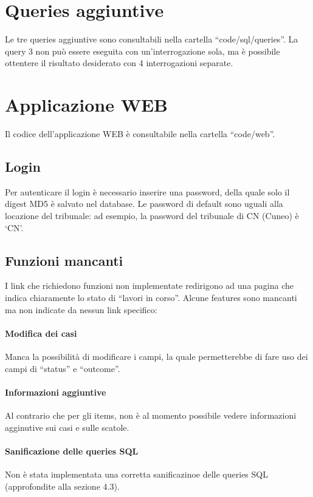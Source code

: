 {\section{Queries aggiuntive}

Le tre queries aggiuntive sono consultabili nella cartella ``code/sql/queries''. La query 3 non può essere eseguita con un'interrogazione sola, ma è possibile ottentere il risultato desiderato con 4 interrogazioni separate.

\section{Applicazione WEB}

Il codice dell'applicazione WEB è consultabile nella cartella ``code/web''.

\subsection{Login}

Per autenticare il login è necessario inserire una password, della quale solo il digest MD5 è salvato nel database. Le password di default sono uguali alla locazione del tribunale: ad esempio, la password del tribunale di CN (Cuneo) è `CN'.

\subsection{Funzioni mancanti}

I link che richiedono funzioni non implementate redirigono ad una pagina che indica chiaramente lo stato di ``lavori in corso''. Alcune features sono mancanti ma non indicate da nessun link specifico:

\paragraph{Modifica dei casi}
Manca la possibilità di modificare i campi, la quale permetterebbe di fare uso dei campi di ``status'' e ``outcome''.

\paragraph{Informazioni aggiuntive}
Al contrario che per gli items, non è al momento possibile vedere informazioni agginutive sui casi e sulle scatole.

\paragraph{Sanificazione delle queries SQL}
Non è stata implementata una corretta sanificazinoe delle queries SQL (approfondite alla sezione 4.3).

}
